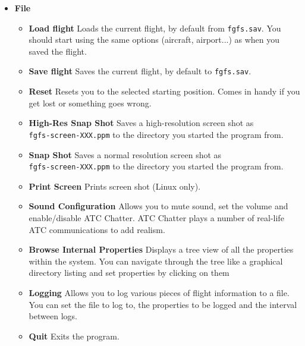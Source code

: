 \begin{itemize}
 \item \textbf{File}
 \begin{itemize}
 \item \textbf{Load flight} Loads the current flight, by
default from \texttt{fgfs.sav}. You should
start \FlightGear{} using the same options (aircraft, airport...) as when you
saved the flight.
  \item \textbf{Save flight} Saves the current flight, by
default to \texttt{fgfs.sav}.
 \item \textbf{Reset} Resets you to the selected starting
position.
 Comes in handy if you get lost or something goes wrong.
  \item \textbf{High-Res Snap Shot} Saves a high-resolution screen
shot as \\ \texttt{fgfs-screen-XXX.ppm} to
  the directory you started the program from.
  \item \textbf{Snap Shot} Saves a normal resolution screen
shot as \\ \texttt{fgfs-screen-XXX.ppm} to
  the directory you started the program from.
  \item \textbf{Print Screen} Prints screen shot (Linux only).
  \item \textbf{Sound Configuration} Allows you to mute sound, set the volume
and enable/disable ATC Chatter.
  ATC Chatter plays a number of real-life ATC communications to add realism.
  \item \textbf{Browse Internal Properties} Displays a tree view of all the
properties within the system.
  You can navigate through the tree like a graphical directory listing and set
properties by clicking on them
  \item \textbf{Logging} Allows you to log various pieces of flight information
to a file.
  You can set the file to log to, the properties to be logged and the interval
between logs.
  \item \textbf{Quit} Exits the program.
 \end{itemize}


\end{itemize}
